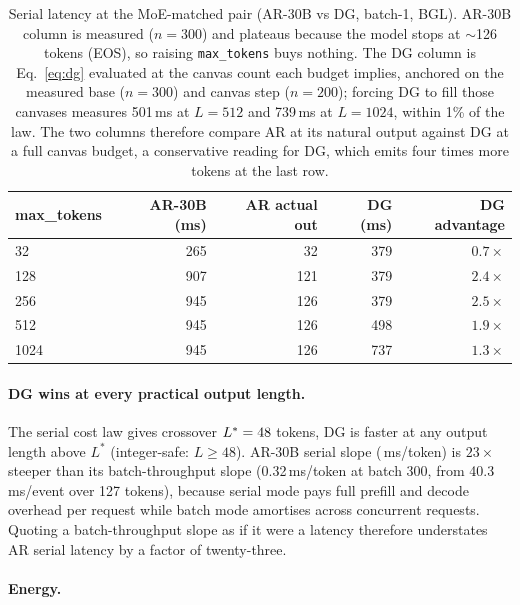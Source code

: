 \begin{table}[h]
\centering
\caption{Serial latency at the MoE-matched pair (AR-30B vs DG,
batch-1, BGL). AR-30B column is measured ($n{=}300$) and plateaus
because the model stops at $\sim$126 tokens (EOS), so raising
\texttt{max\_tokens} buys nothing. The DG column is Eq.~\ref{eq:dg}
evaluated at the canvas count each budget implies, anchored on the
measured base ($n{=}300$) and canvas step ($n{=}200$); forcing DG to
fill those canvases measures 501\,ms at $L{=}512$ and 739\,ms at
$L{=}1024$, within 1\% of the law. The two columns therefore compare
AR at its natural output against DG at a full canvas budget, a
conservative reading for DG, which emits four times more tokens at the
last row.}
\label{tab:niche}
\begin{tabular}{@{}lrrrr@{}}
\toprule
max\_tokens & AR-30B (ms) & AR actual out & DG (ms) & DG advantage \\
\midrule
32   & 265  & 32  & 379 & $0.7\times$ \\
128  & 907  & 121 & 379 & $2.4\times$ \\
256  & 945  & 126 & 379 & $2.5\times$ \\
512  & 945  & 126 & 498 & $1.9\times$ \\
1024 & 945  & 126 & 737 & $1.3\times$ \\
\bottomrule
\end{tabular}
\end{table}

\paragraph{DG wins at every practical output length.}

The serial cost law gives crossover $L^{*} = 48$ tokens, DG
is faster at any output length above $L^{*}$ (integer-safe: $L \geq 48$).
AR-30B serial slope (\arSlope\,ms/token) is $23\times$ steeper than
its batch-throughput slope (0.32\,ms/token at batch 300, from
40.3\,ms/event over 127 tokens), because serial mode pays full prefill
and decode overhead per request while batch mode amortises across
concurrent requests. Quoting a batch-throughput slope as if it were a
latency therefore understates AR serial latency by a factor of
twenty-three.

\paragraph{Energy.}

